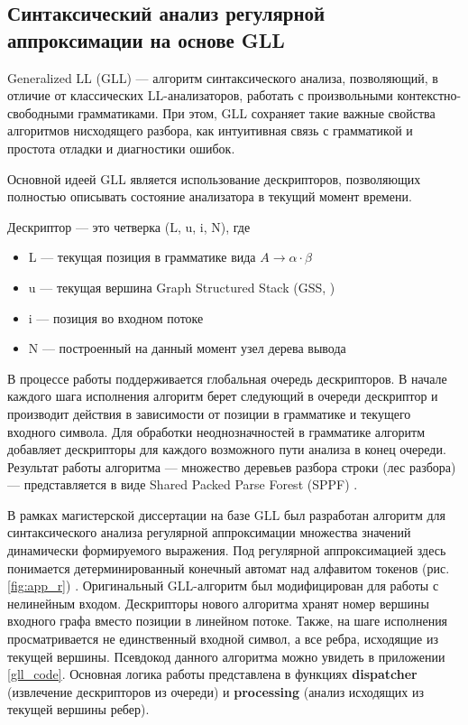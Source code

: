 \subsection{Синтаксический анализ регулярной аппроксимации на основе GLL}

Generalized LL (GLL) \cite{gll} --- алгоритм синтаксического анализа, позволяющий, в отличие от классических LL-анализаторов, работать с произвольными контекстно-свободными грамматиками. 
При этом, GLL сохраняет такие важные свойства алгоритмов нисходящего разбора, как интуитивная связь с грамматикой и простота отладки и диагностики ошибок.

Основной идеей GLL является использование дескрипторов, позволяющих полностью описывать состояние анализатора в текущий момент времени.

\begin{definition}
	Дескриптор --- это четверка (L, u, i, N), где
	\begin{itemize}
		\setlength\itemsep{0em}
		\item L --- текущая позиция в грамматике вида $A \rightarrow \alpha \cdot \beta$
		\item u --- текущая вершина Graph Structured Stack (GSS, \cite{tomita})
		\item i --- позиция во входном потоке
		\item N --- построенный на данный момент узел дерева вывода  
	\end{itemize}
\end{definition}  

В процессе работы поддерживается глобальная очередь дескрипторов. В начале каждого шага исполнения алгоритм берет следующий в очереди дескриптор и производит действия в зависимости от позиции в грамматике и текущего входного символа. 
Для обработки неоднозначностей в грамматике алгоритм добавляет дескрипторы для каждого возможного пути анализа в конец очереди. Результат работы алгоритма ---  множество деревьев разбора строки (лес разбора) --- представляется в виде Shared Packed Parse Forest (SPPF) \cite{sppf}.

В рамках магистерской диссертации \cite{gll_reg} на базе GLL был разработан алгоритм для синтаксического анализа регулярной аппроксимации множества значений динамически формируемого выражения. 
Под регулярной аппроксимацией здесь понимается детерминированный конечный автомат над алфавитом токенов (рис. \ref{fig:app_r}) . Оригинальный GLL-алгоритм был модифицирован для работы с нелинейным входом. 
Дескрипторы нового алгоритма хранят номер вершины входного графа вместо позиции в линейном потоке. Также, на шаге исполнения просматривается не единственный входной символ, а все ребра, исходящие из текущей вершины. Псевдокод данного алгоритма можно увидеть в приложении \ref{gll_code}. Основная логика работы представлена в функциях \textbf{dispatcher} (извлечение дескрипторов из очереди) и \textbf{processing} (анализ исходящих из текущей вершины ребер).

